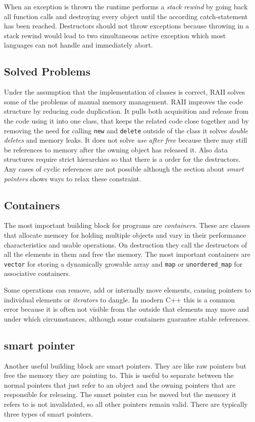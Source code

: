\documentclass[conference,twocolumn]{IEEEtran}
\begin{document}
When an exception is thrown the runtime performs a \emph{stack rewind} by going back all function calls and destroying every object until the according catch-statement has been reached. Destructors should not throw exceptions because throwing in a stack rewind would lead to two simultaneous active exception which most languages can not handle and immediately abort.

\subsection{Solved Problems}
Under the assumption that the implementation of classes is correct, RAII solves some of the problems of manual memory management.
RAII improves the code structure by reducing code duplication. It pulls both acquisition and release from the code using it into one class, that keeps the related code close together and by removing the need for calling \verb|new| and \verb|delete| outside of the class it solves \emph{double deletes} and memory leaks. It does not solve \emph{use after free} because there may still be references to memory after the owning object has released it.
Also data structures require strict hierarchies so that there is a order for the destructors. Any cases of cyclic references are not possible although the section about \emph{smart pointers} shows ways to relax these constraint.


\subsection{Containers}
The most important building block for programs are \emph{containers}. These are classes that allocate memory for holding multiple objects and vary in their performance characteristics and usable operations. On destruction they call the destructors of all the elements in them and free the memory. The most important containers are \verb|vector| for storing a dynamically growable array and \verb|map| or \verb|unordered_map| for associative containers.

Some operations can remove, add or internally move elements, causing pointers to individual elements or \emph{iterators} to dangle. In modern C++ this is a common error because it is often not visible from the outside that elements may move and under which circumstances, although some containers guarantee stable references.


\subsection{smart pointer}
Another useful building block are smart pointers. They are like raw pointers but free the memory they are pointing to. This is useful to separate between the normal pointers that just refer to an object and the owning pointers that are responsible for releasing. The smart pointer can be moved but the memory it refers to is not invalidated, so all other pointers remain valid. There are typically three types of smart pointers.
\end{document}
